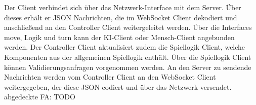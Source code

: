 \newpage
Der Client verbindet sich über das Netzwerk-Interface mit dem Server. Über dieses erhält er JSON Nachrichten, die im WebSocket Client dekodiert und anschließend an den Controller Client weitergeleitet werden. Über die Interfaces move, Logik und turn kann der KI-Client oder Mensch-Client angebunden werden. Der Controller Client aktualisiert zudem die Spiellogik Client, welche Komponenten aus der allgemeinen Spiellogik enthält. Über die Spiellogik Client können Validierungsanfragen vorgenommen werden. An den Server zu sendende Nachrichten werden vom Controller Client an den WebSocket Client weitergegeben, der diese JSON codiert und über das Netzwerk versendet.\\
abgedeckte FA: TODO\\

